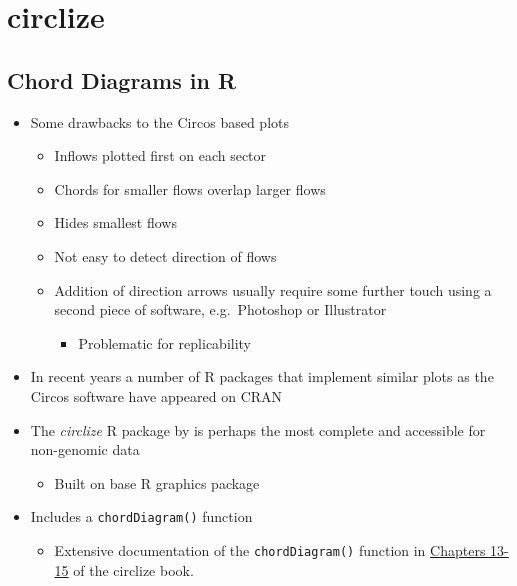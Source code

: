 \documentclass[
]{book}
\providecommand{\tightlist}{%
  \setlength{\itemsep}{0pt}\setlength{\parskip}{0pt}}
\begin{document}
\hypertarget{circlize}{%
\section{circlize}\label{circlize}}

\hypertarget{chord-diagrams-in-r}{%
\subsection{Chord Diagrams in R}\label{chord-diagrams-in-r}}

\begin{itemize}
\tightlist
\item
  Some drawbacks to the Circos based plots

  \begin{itemize}
  \tightlist
  \item
    Inflows plotted first on each sector
  \item
    Chords for smaller flows overlap larger flows
  \item
    Hides smallest flows
  \item
    Not easy to detect direction of flows
  \item
    Addition of direction arrows usually require some further touch using a second piece of software, e.g.~Photoshop or Illustrator

    \begin{itemize}
    \tightlist
    \item
      Problematic for replicability
    \end{itemize}
  \end{itemize}
\item
  In recent years a number of R packages that implement similar plots as the Circos software have appeared on CRAN
\item
  The \emph{circlize} R package by \citet{Gu2014} is perhaps the most complete and accessible for non-genomic data

  \begin{itemize}
  \tightlist
  \item
    Built on base R graphics package
  \end{itemize}
\item
  Includes a \texttt{chordDiagram()} function

  \begin{itemize}
  \tightlist
  \item
    Extensive documentation of the \texttt{chordDiagram()} function in \href{https://jokergoo.github.io/circlize_book/book/the-chorddiagram-function.html}{Chapters 13-15} of the circlize book.
  \end{itemize}
\end{itemize}
\end{document}
